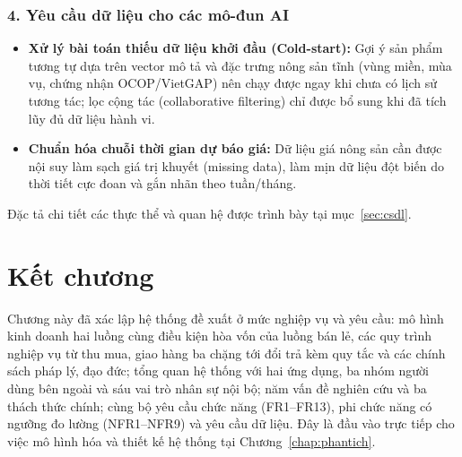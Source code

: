 \subsubsection*{4. Yêu cầu dữ liệu cho các mô-đun AI}
\begin{itemize}
    \item \textbf{Xử lý bài toán thiếu dữ liệu khởi đầu (Cold-start):} Gợi ý sản phẩm tương tự dựa trên vector mô tả và đặc trưng nông sản tĩnh (vùng miền, mùa vụ, chứng nhận OCOP/VietGAP) nên chạy được ngay khi chưa có lịch sử tương tác; lọc cộng tác (collaborative filtering) chỉ được bổ sung khi đã tích lũy đủ dữ liệu hành vi.
    \item \textbf{Chuẩn hóa chuỗi thời gian dự báo giá:} Dữ liệu giá nông sản cần được nội suy làm sạch giá trị khuyết (missing data), làm mịn dữ liệu đột biến do thời tiết cực đoan và gắn nhãn theo tuần/tháng.
\end{itemize}
Đặc tả chi tiết các thực thể và quan hệ được trình bày tại mục~\ref{sec:csdl}.

\section{Kết chương}

Chương này đã xác lập hệ thống đề xuất ở mức nghiệp vụ và yêu cầu: mô hình kinh doanh hai luồng cùng điều kiện hòa vốn của luồng bán lẻ, các quy trình nghiệp vụ từ thu mua, giao hàng ba chặng tới đổi trả kèm quy tắc và các chính sách pháp lý, đạo đức; tổng quan hệ thống với hai ứng dụng, ba nhóm người dùng bên ngoài và sáu vai trò nhân sự nội bộ; năm vấn đề nghiên cứu và ba thách thức chính; cùng bộ yêu cầu chức năng (FR1--FR13), phi chức năng có ngưỡng đo lường (NFR1--NFR9) và yêu cầu dữ liệu. Đây là đầu vào trực tiếp cho việc mô hình hóa và thiết kế hệ thống tại Chương~\ref{chap:phantich}.
